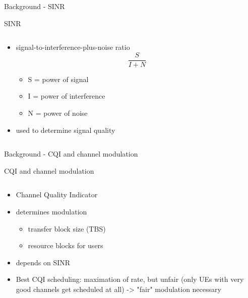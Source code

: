 \documentclass[xcolor={cmyk}]{beamer}
\begin{document}
 \begin{frame}{Background - SINR}
 	\begin{block}{SINR}
		\begin{columns}
			\begin{column}{.9\textwidth}
				\begin{itemize}
					\item signal-to-interference-plus-noise ratio
					\begin{equation}
\frac{S}{I + N}
					\end{equation}
					\begin{itemize}
						\item S = power of signal
						\item I = power of interference
						\item N = power of noise
					\end{itemize}
					\item used to determine signal quality
				\end{itemize}
			\end{column}
		\end{columns}
	 \end{block}
 \end{frame}

 \begin{frame}{Background - CQI and channel modulation}
 	\begin{block}{CQI and channel modulation}
		\begin{columns}
			\begin{column}{.9\textwidth}
				\begin{itemize}
					\item Channel Quality Indicator
					\item determines modulation
					\begin{itemize}
						\item transfer block size (TBS)
						\item resource blocks for users
					\end{itemize}
					\item depends on SINR
					\item Best CQI scheduling: maximation of rate, but unfair (only UEs with very good channels get scheduled at all) -> "fair" modulation necessary
				\end{itemize}
			\end{column}
		\end{columns}
	 \end{block}
 \end{frame}
\end{document}

